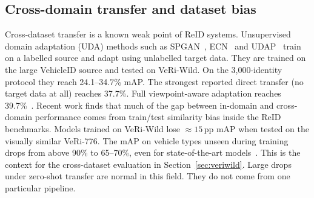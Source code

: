 \subsection{Cross-domain transfer and dataset bias}
Cross-dataset transfer is a known weak point of ReID systems. Unsupervised domain adaptation (UDA) methods such as SPGAN~\cite{deng2018spgan}, ECN~\cite{zhong2019ecn} and UDAP~\cite{song2020udap} train on a labelled source and adapt using unlabelled target data. They are trained on the large VehicleID source and tested on VeRi-Wild. On the 3{,}000-identity protocol they reach 24.1--34.7\% mAP. The strongest reported direct transfer (no target data at all) reaches 37.7\%. Full viewpoint-aware adaptation reaches 39.7\%~\cite{zheng2020vapc}. Recent work finds that much of the gap between in-domain and cross-domain performance comes from train/test similarity bias inside the ReID benchmarks. Models trained on VeRi-Wild lose ${\approx}15$\,pp mAP when tested on the visually similar VeRi-776. The mAP on vehicle types unseen during training drops from above 90\% to 65--70\%, even for state-of-the-art models~\cite{benmabrouk2026genlimits}. This is the context for the cross-dataset evaluation in Section~\ref{sec:veriwild}. Large drops under zero-shot transfer are normal in this field. They do not come from one particular pipeline.
